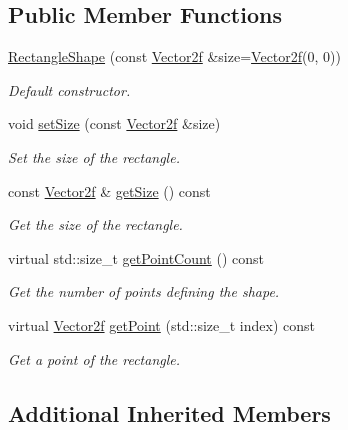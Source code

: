 \subsection*{Public Member Functions}
\begin{DoxyCompactItemize}
\item 
\hyperlink{classsf_1_1_rectangle_shape_a83a2be157ebee85c95ed491c3e78dd7c}{Rectangle\+Shape} (const \hyperlink{classsf_1_1_vector2}{Vector2f} \&size=\hyperlink{classsf_1_1_vector2}{Vector2f}(0, 0))
\begin{DoxyCompactList}\small\item\em Default constructor. \end{DoxyCompactList}\item 
void \hyperlink{classsf_1_1_rectangle_shape_a5c65d374d4a259dfdc24efdd24a5dbec}{set\+Size} (const \hyperlink{classsf_1_1_vector2}{Vector2f} \&size)
\begin{DoxyCompactList}\small\item\em Set the size of the rectangle. \end{DoxyCompactList}\item 
const \hyperlink{classsf_1_1_vector2}{Vector2f} \& \hyperlink{classsf_1_1_rectangle_shape_ae54a07ff5537bf76de6748f592b34896}{get\+Size} () const
\begin{DoxyCompactList}\small\item\em Get the size of the rectangle. \end{DoxyCompactList}\item 
virtual std\+::size\+\_\+t \hyperlink{classsf_1_1_rectangle_shape_adfb2f429e5720c9ccdb26d5996c3ae33}{get\+Point\+Count} () const
\begin{DoxyCompactList}\small\item\em Get the number of points defining the shape. \end{DoxyCompactList}\item 
virtual \hyperlink{classsf_1_1_vector2}{Vector2f} \hyperlink{classsf_1_1_rectangle_shape_a3909f1a1946930ff5ae17c26206c0f81}{get\+Point} (std\+::size\+\_\+t index) const
\begin{DoxyCompactList}\small\item\em Get a point of the rectangle. \end{DoxyCompactList}\end{DoxyCompactItemize}
\subsection*{Additional Inherited Members}


